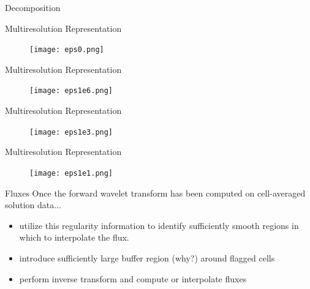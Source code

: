 \documentclass{beamer}
\begin{document}
\begin{frame}{Decomposition}
    \begin{figure}
        \center
        
    \end{figure}
\end{frame}

\begin{frame}{Multiresolution Representation}
    \begin{figure}
        \center
        \texttt{[image: eps0.png]}
    \end{figure}
\end{frame}

\begin{frame}{Multiresolution Representation}
    \begin{figure}
        \center
        \texttt{[image: eps1e6.png]}
    \end{figure}
\end{frame}

\begin{frame}{Multiresolution Representation}
    \begin{figure}
        \center
        \texttt{[image: eps1e3.png]}
    \end{figure}
\end{frame}

\begin{frame}{Multiresolution Representation}
    \begin{figure}
        \center
        \texttt{[image: eps1e1.png]}
    \end{figure}
\end{frame}

\begin{frame}{Fluxes}
    Once the forward wavelet transform has been computed on cell-averaged solution data...
    \begin{itemize}
        \item<2-> utilize this regularity information to identify sufficiently smooth regions
            in which to interpolate the flux.
        \item<3-> introduce sufficiently large buffer region (why?) around flagged cells
        \item<4-> perform inverse transform and compute or interpolate fluxes
    \end{itemize}
\end{frame}
\end{document}
